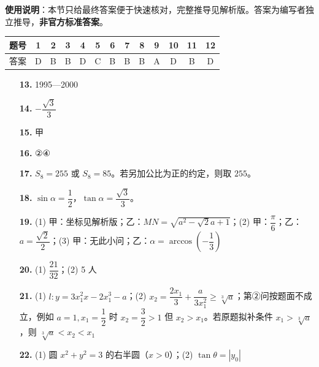 
\begin{gknotice}
\textbf{使用说明}：本节只给最终答案便于快速核对，完整推导见解析版。答案为编写者独立推导，\textbf{非官方标准答案}。
\end{gknotice}

\begin{center}\begin{tabular}{ccccccccccccc}
\toprule
题号 & 1 & 2 & 3 & 4 & 5 & 6 & 7 & 8 & 9 & 10 & 11 & 12 \\
\midrule
答案 & D & B & B & D & C & B & B & B & A & D & B & D \\
\bottomrule
\end{tabular}\end{center}

\begin{itemize}[leftmargin=2.6em]
  \item[\textbf{13.}] 1995—2000
  \item[\textbf{14.}] $-\dfrac{\sqrt3}{3}$
  \item[\textbf{15.}] 甲
  \item[\textbf{16.}] ②④
\end{itemize}

\begin{itemize}[leftmargin=2.6em]
  \item[\textbf{17.}] $S_8=255$ 或 $S_8=85$。若另加公比为正的约定，则取 $255$。
  \item[\textbf{18.}] $\sin\alpha=\dfrac12$，$\tan\alpha=\dfrac{\sqrt3}{3}$。
  \item[\textbf{19.}] (1) 甲：坐标见解析版；乙：$MN=\sqrt{a^2-\sqrt2a+1}$；(2) 甲：$\dfrac\pi6$；乙：$a=\dfrac{\sqrt2}{2}$；(3) 甲：无此小问；乙：$\alpha=\arccos\left(-\dfrac13\right)$
  \item[\textbf{20.}] (1) $\dfrac{21}{32}$；(2) 5 人
  \item[\textbf{21.}] (1) $l:y=3x_1^2x-2x_1^3-a$；(2) $x_2=\dfrac{2x_1}{3}+\dfrac{a}{3x_1^2}\geqslant\sqrt[3]{a}$；第②问按题面不成立，例如 $a=1,x_1=\dfrac12$ 时 $x_2=\dfrac32>1$ 但 $x_2>x_1$。若原题拟补条件 $x_1>\sqrt[3]{a}$，则 $\sqrt[3]{a}<x_2<x_1$
  \item[\textbf{22.}] (1) 圆 $x^2+y^2=3$ 的右半圆（$x>0$）；(2) $\tan\theta=|y_0|$
\end{itemize}
